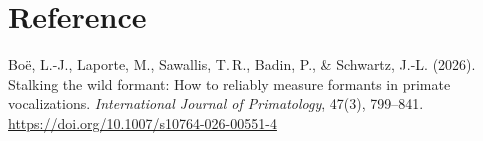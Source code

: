 \documentclass[11pt,a4paper]{article}
\begin{document}
\clearpage
\section*{Reference}
\small
Bo\"e, L.-J., Laporte, M., Sawallis, T.\,R., Badin, P., \& Schwartz,
J.-L. (2026). Stalking the wild formant: How to reliably measure
formants in primate vocalizations. \emph{International Journal of
Primatology}, 47(3), 799--841.
\url{https://doi.org/10.1007/s10764-026-00551-4}
\end{document}
